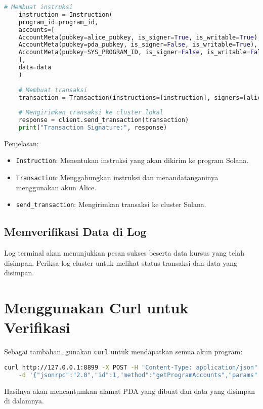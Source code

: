 \begin{lstlisting}[language=Python]
	# Membuat instruksi
	instruction = Instruction(
	program_id=program_id,
	accounts=[
	AccountMeta(pubkey=alice_pubkey, is_signer=True, is_writable=True),
	AccountMeta(pubkey=pda_pubkey, is_signer=False, is_writable=True),
	AccountMeta(pubkey=SYS_PROGRAM_ID, is_signer=False, is_writable=False),
	],
	data=data
	)
	
	# Membuat transaksi
	transaction = Transaction(instructions=[instruction], signers=[alice_keypair])
	
	# Mengirimkan transaksi ke cluster lokal
	response = client.send_transaction(transaction)
	print("Transaction Signature:", response)
\end{lstlisting}

Penjelasan:
\begin{itemize}
	\item \texttt{Instruction}: Menentukan instruksi yang akan dikirim ke program Solana.
	\item \texttt{Transaction}: Menggabungkan instruksi dan menandatanganinya menggunakan akun Alice.
	\item \texttt{send\_transaction}: Mengirimkan transaksi ke cluster Solana.
\end{itemize}

\subsection{Memverifikasi Data di Log}
Log terminal akan menunjukkan pesan sukses beserta data kursus yang telah disimpan. Periksa log cluster untuk melihat status transaksi dan data yang disimpan.

\section{Menggunakan Curl untuk Verifikasi}
Sebagai tambahan, gunakan \texttt{curl} untuk mendapatkan semua akun program:

\begin{lstlisting}[language=bash]
	curl http://127.0.0.1:8899 -X POST -H "Content-Type: application/json" \
	-d '{"jsonrpc":"2.0","id":1,"method":"getProgramAccounts","params":["ProgramID"]}'
\end{lstlisting}

Hasilnya akan mencantumkan alamat PDA yang dibuat dan data yang disimpan di dalamnya.

